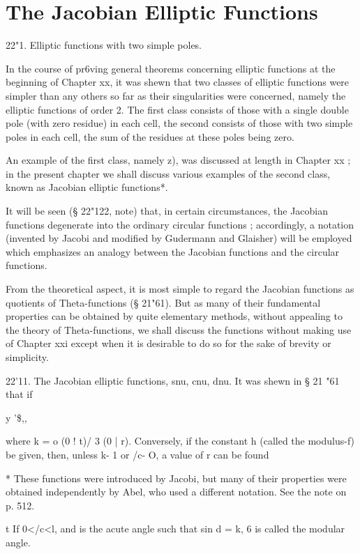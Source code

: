 \chapter{The Jacobian Elliptic Functions} 

22"1. Elliptic functions with two simple poles.

In the course of pr6ving general theorems concerning elliptic
functions at the beginning of Chapter xx, it was shewn that two
classes of elliptic functions were simpler than any others so far as
their singularities were concerned, namely the elliptic functions of
order 2. The first class consists of those with a single double pole
(with zero residue) in each cell, the second consists of those with
two simple poles in each cell, the sum of the residues at these poles
being zero.

An example of the first class, namely z), was discussed at length in
Chapter xx ; in the present chapter we shall discuss various examples
of the second class, known as Jacobian elliptic functions*.

It will be seen (§ 22"122, note) that, in certain circumstances, the
Jacobian functions degenerate into the ordinary circular functions ;
accordingly, a notation (invented by Jacobi and modified by Gudermann
and Glaisher) will be employed which emphasizes an analogy between the
Jacobian functions and the circular functions.

From the theoretical aspect, it is most simple to regard the Jacobian
functions as quotients of Theta-functions (§ 21"61). But as many of
their fundamental properties can be obtained by quite elementary
methods, without appealing to the theory of Theta-functions, we shall
discuss the functions without making use of Chapter xxi except when it
is desirable to do so for the sake of brevity or simplicity.

22'11. The Jacobian elliptic functions, snu, cnu, dnu. It was shewn in
§ 21 "61 that if

y '\$,,%

where k = o (0 ! t)/ 3 (0 | r). Conversely, if the constant h (called
the modulus-f) be given, then, unless k- 1 or /c- O, a value of r can
be found

* These functions were introduced by Jacobi, but many of their
properties were obtained independently by Abel, who used a different
notation. See the note on p. 512.

t If 0</c<l, and is the acute angle such that sin d = k, 6 is called
the modular angle.

